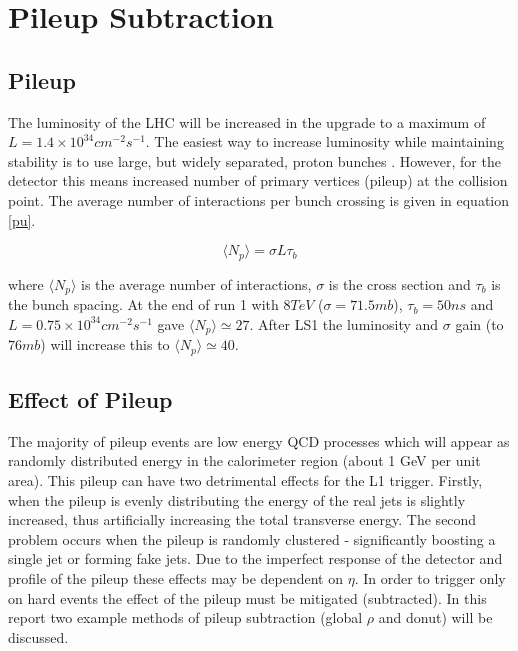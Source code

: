 \section{Pileup Subtraction}
\subsection{Pileup}
The luminosity of the LHC will be increased in the upgrade to a maximum of $L = 1.4\times10^{34} cm^{-2}s^{-1}$. The easiest way to increase luminosity while maintaining stability is to use large, but widely separated, proton bunches \cite{PUform}. However, for the detector this means increased number of primary vertices (pileup) at the collision point. The average number of interactions per bunch crossing is given in equation \ref{pu}.

\begin{equation}
\langle N_p \rangle = \sigma L \tau_b
\label{pu}
\end{equation}

where $\langle N_p \rangle$ is the average number of interactions, $\sigma$ is the cross section and $\tau_b$ is the bunch spacing. At the end of run 1 with $8 TeV$ ($\sigma = 71.5mb$), $\tau_b = 50ns$ and $L = 0.75\times10^{34} cm^{-2}s^{-1}$ gave $\langle N_p \rangle\simeq27$. After LS1 the luminosity and $\sigma$ gain (to $76mb$) will increase this to $\langle N_p \rangle\simeq40$. 
\subsection{Effect of Pileup}
The majority of pileup events are low energy QCD processes which will appear as randomly distributed energy in the calorimeter region (about 1 GeV per unit area). This pileup can have two detrimental effects for the L1 trigger. Firstly, when the pileup is evenly distributing the energy of the real jets is slightly increased, thus artificially increasing the total transverse energy. The second problem occurs when the pileup is randomly clustered - significantly boosting a single jet or forming fake jets. Due to the imperfect response of the detector and profile of the pileup these effects may be dependent on $\eta$. In order to trigger only on hard events the effect of the pileup must be mitigated (subtracted). In this report two example methods of pileup subtraction (global $\rho$ and donut) will be discussed.

